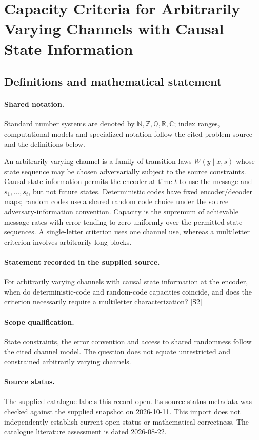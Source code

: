 \documentclass[11pt]{article}
\newcommand{\sref}[2]{\hyperlink{source:#1:#2}{[S#2]}}
\begin{document}
\section{Capacity Criteria for Arbitrarily Varying Channels with Causal State Information}\label{statement}

\subsection{Definitions and mathematical statement}

\paragraph{Shared notation.}Standard number systems are denoted by $\mathbb N,\mathbb Z,\mathbb Q,\mathbb R,\mathbb C$; index ranges, computational models and specialized notation follow the cited problem source and the definitions below.


An arbitrarily varying channel is a family of transition laws $W(y\mid x,s)$ whose state sequence may be chosen adversarially subject to the source constraints. Causal state information permits the encoder at time $t$ to use the message and $s_1,\ldots,s_t$, but not future states. Deterministic codes have fixed encoder/decoder maps; random codes use a shared random code choice under the source adversary-information convention. Capacity is the supremum of achievable message rates with error tending to zero uniformly over the permitted state sequences. A single-letter criterion uses one channel use, whereas a multiletter criterion involves arbitrarily long blocks.
\paragraph{Statement recorded in the supplied source.}
For arbitrarily varying channels with causal state information at the encoder, when do deterministic-code and random-code capacities coincide, and does the criterion necessarily require a multiletter characterization? \sref{statement}{2}
\paragraph{Scope qualification.}
State constraints, the error convention and access to shared randomness follow the cited channel model. The question does not equate unrestricted and constrained arbitrarily varying channels.
\paragraph{Source status.}
The supplied catalogue labels this record open. Its source-status metadata was checked against the supplied snapshot on 2026-10-11. This import does not independently establish current open status or mathematical correctness. The catalogue literature assessment is dated 2026-08-22.
\end{document}
